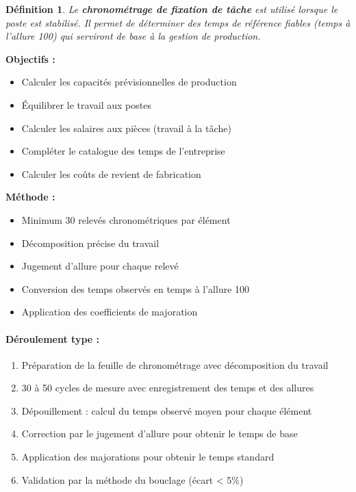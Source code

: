 \documentclass[a4paper,12pt]{article}
\newtheorem{definition}{Définition}[section]
\begin{document}
\begin{definition}
Le \textbf{chronométrage de fixation de tâche} est utilisé lorsque le poste est stabilisé. Il permet de déterminer des temps de référence fiables (temps à l'allure 100) qui serviront de base à la gestion de production.
\end{definition}

\textbf{Objectifs :}
\begin{itemize}
    \item Calculer les capacités prévisionnelles de production
    \item Équilibrer le travail aux postes
    \item Calculer les salaires aux pièces (travail à la tâche)
    \item Compléter le catalogue des temps de l'entreprise
    \item Calculer les coûts de revient de fabrication
\end{itemize}

\textbf{Méthode :}
\begin{itemize}
    \item Minimum 30 relevés chronométriques par élément
    \item Décomposition précise du travail
    \item Jugement d'allure pour chaque relevé
    \item Conversion des temps observés en temps à l'allure 100
    \item Application des coefficients de majoration
\end{itemize}

\paragraph{Déroulement type :}
\begin{enumerate}
    \item Préparation de la feuille de chronométrage avec décomposition du travail
    \item 30 à 50 cycles de mesure avec enregistrement des temps et des allures
    \item Dépouillement : calcul du temps observé moyen pour chaque élément
    \item Correction par le jugement d'allure pour obtenir le temps de base
    \item Application des majorations pour obtenir le temps standard
    \item Validation par la méthode du bouclage (écart < 5\%)
\end{enumerate}
\end{document}
